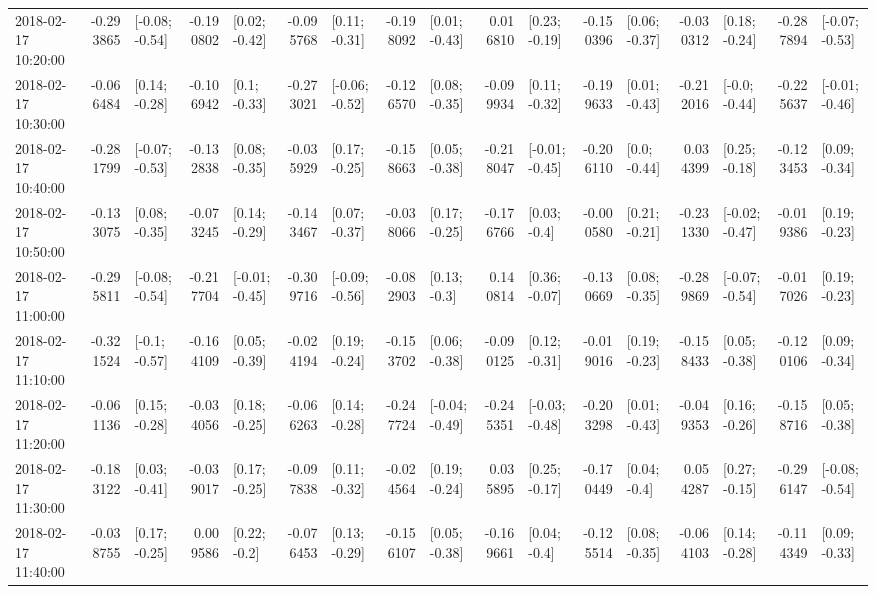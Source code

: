 \begin{tabular}{lrlrlrlrlrlrlrlrl}
2018-02-17 10:20:00 & -0.293865 &  [-0.08; -0.54] & -0.190802 &   [0.02; -0.42] & -0.095768 &   [0.11; -0.31] & -0.198092 &   [0.01; -0.43] &  0.016810 &   [0.23; -0.19] & -0.150396 &   [0.06; -0.37] & -0.030312 &   [0.18; -0.24] & -0.287894 &  [-0.07; -0.53] \\
2018-02-17 10:30:00 & -0.066484 &   [0.14; -0.28] & -0.106942 &    [0.1; -0.33] & -0.273021 &  [-0.06; -0.52] & -0.126570 &   [0.08; -0.35] & -0.099934 &   [0.11; -0.32] & -0.199633 &   [0.01; -0.43] & -0.212016 &   [-0.0; -0.44] & -0.225637 &  [-0.01; -0.46] \\
2018-02-17 10:40:00 & -0.281799 &  [-0.07; -0.53] & -0.132838 &   [0.08; -0.35] & -0.035929 &   [0.17; -0.25] & -0.158663 &   [0.05; -0.38] & -0.218047 &  [-0.01; -0.45] & -0.206110 &    [0.0; -0.44] &  0.034399 &   [0.25; -0.18] & -0.123453 &   [0.09; -0.34] \\
2018-02-17 10:50:00 & -0.133075 &   [0.08; -0.35] & -0.073245 &   [0.14; -0.29] & -0.143467 &   [0.07; -0.37] & -0.038066 &   [0.17; -0.25] & -0.176766 &    [0.03; -0.4] & -0.000580 &   [0.21; -0.21] & -0.231330 &  [-0.02; -0.47] & -0.019386 &   [0.19; -0.23] \\
2018-02-17 11:00:00 & -0.295811 &  [-0.08; -0.54] & -0.217704 &  [-0.01; -0.45] & -0.309716 &  [-0.09; -0.56] & -0.082903 &    [0.13; -0.3] &  0.140814 &   [0.36; -0.07] & -0.130669 &   [0.08; -0.35] & -0.289869 &  [-0.07; -0.54] & -0.017026 &   [0.19; -0.23] \\
2018-02-17 11:10:00 & -0.321524 &   [-0.1; -0.57] & -0.164109 &   [0.05; -0.39] & -0.024194 &   [0.19; -0.24] & -0.153702 &   [0.06; -0.38] & -0.090125 &   [0.12; -0.31] & -0.019016 &   [0.19; -0.23] & -0.158433 &   [0.05; -0.38] & -0.120106 &   [0.09; -0.34] \\
2018-02-17 11:20:00 & -0.061136 &   [0.15; -0.28] & -0.034056 &   [0.18; -0.25] & -0.066263 &   [0.14; -0.28] & -0.247724 &  [-0.04; -0.49] & -0.245351 &  [-0.03; -0.48] & -0.203298 &   [0.01; -0.43] & -0.049353 &   [0.16; -0.26] & -0.158716 &   [0.05; -0.38] \\
2018-02-17 11:30:00 & -0.183122 &   [0.03; -0.41] & -0.039017 &   [0.17; -0.25] & -0.097838 &   [0.11; -0.32] & -0.024564 &   [0.19; -0.24] &  0.035895 &   [0.25; -0.17] & -0.170449 &    [0.04; -0.4] &  0.054287 &   [0.27; -0.15] & -0.296147 &  [-0.08; -0.54] \\
2018-02-17 11:40:00 & -0.038755 &   [0.17; -0.25] &  0.009586 &    [0.22; -0.2] & -0.076453 &   [0.13; -0.29] & -0.156107 &   [0.05; -0.38] & -0.169661 &    [0.04; -0.4] & -0.125514 &   [0.08; -0.35] & -0.064103 &   [0.14; -0.28] & -0.114349 &   [0.09; -0.33] \\

\end{tabular}
